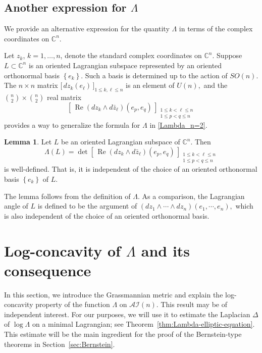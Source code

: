 \documentclass[11pt]{amsart}
\numberwithin{equation}{section}
\theoremstyle{definition}
\theoremstyle{definition}
\newtheorem{lemma}[equation]{Lemma}
\newcommand{\set}[1]{\left\{#1\right\}}
\newcommand{\pr}[1]{\left(#1\right)}
\newcommand{\D}{\Delta}
\begin{document}
\subsection{Another expression for  $\Lambda$}

We provide an alternative expression for the quantity $\Lambda$ in terms of the complex coordinates on $\mathbb{C}^n$.

Let $z_k$, $k=1,\dots,n$, denote the standard complex coordinates on $\mathbb{C}^n$.
Suppose $L \subset \mathbb{C}^n$ is an oriented Lagrangian subspace represented by an oriented orthonormal basis $\set{e_k}$. Such a basis is determined up to the action of ${SO}(n)$.
The $n\times n$ matrix
$\big[\,dz_k(e_\ell)\,\big]_{1\le k,\ell\le n}$
is an element of ${U}(n),$ and the $\binom{n}{2}\times \binom{n}{2}$ real matrix
$$\left[\, \operatorname{Re}\!\left(dz_k \wedge d\bar{z}_\ell\right)(e_p, e_q) \,\right]_{\substack{1\le k<\ell\le n \\ 1\le p<q\le n}}$$
provides a way to generalize the formula for $\Lambda$ in \eqref{Lambda_n=2}.

\begin{lemma}
   Let $L$ be an oriented Lagrangian subspace of $\mathbb{C}^n$. Then
    \begin{equation*}
    \Lambda(L)
    =
    \det
    \left[\, \operatorname{Re}\!\left(dz_k \wedge d\bar{z}_\ell\right)(e_p, e_q) \,\right]_{\substack{1\le k<\ell\le n \\ 1\le p<q\le n}}
    \end{equation*}
    is well-defined. 
    That is, it is independent of the choice of an oriented orthonormal basis $\set{e_k}$ of $L$.
\end{lemma}

The lemma follows from the definition of $\Lambda.$
As a comparison, the Lagrangian angle of $L$ is defined to be the argument of  
$\pr{dz_1\wedge \cdots \wedge dz_n}(e_1, \cdots, e_n),$
which is also independent of the choice of an oriented orthonormal basis. 






\section{\bf Log-concavity of $\Lambda$ and its consequence}
\label{sec:log-concavity}

In this section, we introduce the Grassmannian metric and explain the log-concavity property of the function $\Lambda$ on $\mathcal{AI}(n).$
This result may be of independent interest. 
For our purposes, we will use it to estimate the Laplacian $\D$ of $\log\Lambda$ on a minimal Lagrangian; see Theorem~\ref{thm:Lambda-elliptic-equation}.
This estimate will be the main ingredient for the proof of the Bernstein-type theorems in Section~\ref{sec:Bernstein}.
\end{document}
